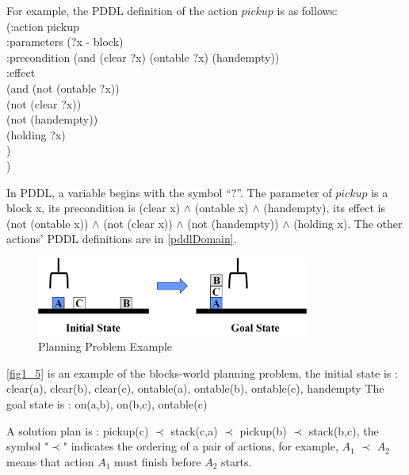 For example, the PDDL definition of the action $pickup$ is as follows:
\\ \hspace*{1.5cm}(:action pickup
\\ \hspace*{2cm}	     :parameters (?x - block)
\\ \hspace*{2cm}	     :precondition (and (clear ?x) (ontable ?x) (handempty))
\\ \hspace*{2cm}	     :effect
\\ \hspace*{2cm}	     (and (not (ontable ?x))
\\ \hspace*{2.5cm}		   (not (clear ?x))
\\ \hspace*{2.5cm}		   (not (handempty))
\\ \hspace*{2.5cm}		   (holding ?x)
\\ \hspace*{2cm})
\\ \hspace*{1.5cm})

In PDDL, a variable begins with the symbol “?”. The parameter of $pickup$ is a block x, its precondition is (clear x) $\wedge$ (ontable x) $\wedge$ (handempty), its effect is (not (ontable x)) $\wedge$ (not (clear x)) $\wedge$ (not (handempty)) $\wedge$ (holding x). The other actions’ PDDL definitions are in \autoref{pddlDomain}.

\begin{figure}[H]
    \center
    \includegraphics[width=0.8\textwidth]{./images/1_5.png}
    \caption{Planning Problem Example}
    \label{fig1_5}
\end{figure}

\autoref{fig1_5} is an example of the blocks-world planning problem, 
the initial state is : 
clear(a), clear(b), clear(c), ontable(a), ontable(b), ontable(c), handempty
The goal state is : 
on(a,b), on(b,c), ontable(c)

A solution plan is :
pickup(c) $\prec$ stack(c,a) $\prec$ pickup(b) $\prec$ stack(b,c),
the symbol "$\prec$" indicates the ordering of a pair of actions, for example, $A_1$ $\prec$ $A_2$ means that action $A_1$ must finish before $A_2$ starts.

